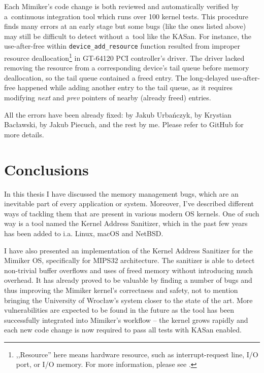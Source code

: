 \documentclass[shortabstract, manyadvisors, english, mgr]{iithesis}
\theoremstyle{definition} \newtheorem*{definition}{Definicja}
\theoremstyle{definition} \newtheorem*{example}{Przykład}
\theoremstyle{definition} \newtheorem*{remark}{Uwaga}
\begin{document}
Each Mimiker's code change is both reviewed and automatically verified by a~continuous integration tool which runs over 100 kernel tests.
This procedure finds many errors at an early stage but some bugs (like the ones listed above) may still be difficult to detect without a~tool like the KASan.
For instance, the use-after-free within \texttt{device\_add\_resource} function resulted from improper resource deallocation\footnote{,,Resource'' here means hardware resource, such as interrupt-request line, I/O port, or I/O memory. For more information, please see \cite{bib:freebsd-drivers}.} in GT-64120 PCI controller's driver. The driver lacked removing the resource from a corresponding device's tail queue before memory deallocation, so the tail queue contained a freed entry. The long-delayed use-after-free happened while adding another entry to the tail queue, as it requires modifying \textit{next} and \textit{prev} pointers of nearby (already freed) entries.

All the errors have been already fixed: \cite{bib:github653} by Jakub Urbańczyk, \cite{bib:github678} by Krystian Bacławski, \cite{bib:github705} by Jakub Piecuch, and the rest by me. Please refer to GitHub for more details.

\chapter{Conclusions}
In this thesis I have discussed the memory management bugs, which are an inevitable part of every application or system. Moreover, I've described different ways of tackling them that are present in various modern OS kernels. One of such way is a tool named the Kernel Address Sanitizer, which in the past few years has been added to i.a. Linux, macOS and NetBSD.

I have also presented an implementation of the Kernel Address Sanitizer for the Mimiker OS, specifically for MIPS32 architecture.
The sanitizer is able to detect non-trivial buffer overflows and uses of freed memory without introducing much overhead.
It has already proved to be valuable by finding a number of bugs and thus improving the Mimiker kernel's correctness and safety, not to mention bringing the University of Wrocław's system closer to the state of the art.
More vulnerabilities are expected to be found in the future as the tool has been successfully integrated into Mimiker's workflow -- the kernel grows rapidly and each new code change is now required to pass all tests with KASan enabled.
\end{document}
